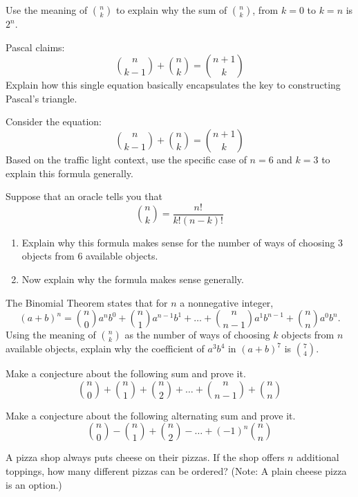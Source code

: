 \documentclass[nooutcomes,noauthor]{ximera}
\begin{document}
\begin{problem}
Use the meaning of $\binom{n}{k}$ to explain why the sum of $\binom{n}{k}$, from $k=0$ to $k=n$ is $2^n$.
\end{problem}

\begin{problem}
Pascal claims:
\[
\binom{n}{k-1} +  \binom{n}{k} = \binom{n+1}{k}
\]
Explain how this single equation basically encapsulates the key
to constructing Pascal's triangle.
\end{problem}

\begin{problem}
Consider the equation:  
\[
\binom{n}{k-1} +  \binom{n}{k} = \binom{n+1}{k}
\]
Based on the traffic light context, use the specific case of $n=6$ and $k=3$ to explain this formula generally.  
\end{problem}

\begin{problem}
Suppose that an oracle tells you that
\[
\binom{n}{k} = \frac{n!}{k!(n-k)!}
\]
\begin{enumerate}
\item Explain why this formula makes sense for the number of ways of choosing $3$ objects from $6$ available objects.  
\item Now explain why the formula makes sense generally.  
\end{enumerate}
\end{problem}


\begin{problem}
The Binomial Theorem states that for $n$ a nonnegative integer, 
\[
(a+b)^n = \binom{n}{0} a^nb^0 + \binom{n}{1} a^{n-1}b^1 + \dots + \binom{n}{n-1} a^{1}b^{n-1} + \binom{n}{n} a^{0}b^n.   
\]
Using the meaning of $\binom{n}{k}$ as the number of ways of choosing $k$ objects from $n$ available objects, explain 
why the coefficient of $a^3b^4$ in $(a+b)^7$ is $\binom{7}{4}$.  
\end{problem}

\begin{problem}
Make a conjecture about the following sum and prove it.  
\[
\binom{n}{0} + \binom{n}{1} + \binom{n}{2} + \dots + \binom{n}{n-1}  + \binom{n}{n} 
\]
\end{problem}

\begin{problem}
Make a conjecture about the following alternating sum and prove it.  
\[
\binom{n}{0} - \binom{n}{1} + \binom{n}{2} - \dots +  (-1)^n\binom{n}{n} 
\]
\end{problem}

\begin{problem}
A pizza shop always puts cheese on their pizzas.  If the shop offers
$n$ additional toppings, how many different pizzas can be ordered?  
(Note: A plain cheese pizza is an option.)
\end{problem}
\end{document}
